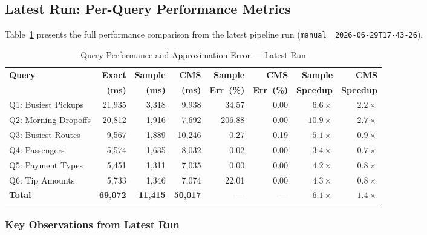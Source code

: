 \documentclass{article}
\begin{document}
\subsection{Latest Run: Per-Query Performance Metrics}

Table~\ref{tab:latest_metrics} presents the full performance comparison from the latest pipeline run (\texttt{manual\_\_2026-06-29T17-43-26}).

\begin{table}[H]
\centering
\caption{Query Performance and Approximation Error — Latest Run}
\label{tab:latest_metrics}
\begin{tabular}{l r r r r r r r}
\toprule
\textbf{Query} & \textbf{Exact} & \textbf{Sample} & \textbf{CMS} & \textbf{Sample} & \textbf{CMS} & \textbf{Sample} & \textbf{CMS} \\
               & \textbf{(ms)}  & \textbf{(ms)}   & \textbf{(ms)} & \textbf{Err~(\%)} & \textbf{Err~(\%)} & \textbf{Speedup} & \textbf{Speedup} \\
\midrule
Q1: Busiest Pickups     & 21{,}935 & 3{,}318 & 9{,}938  & 34.57  & 0.00 & $6.6\times$ & $2.2\times$ \\
Q2: Morning Dropoffs    & 20{,}812 & 1{,}916 & 7{,}692  & 206.88 & 0.00 & $10.9\times$ & $2.7\times$ \\
Q3: Busiest Routes      & 9{,}567  & 1{,}889 & 10{,}246 & 0.27   & 0.19 & $5.1\times$ & $0.9\times$ \\
Q4: Passengers          & 5{,}574  & 1{,}635 & 8{,}032  & 0.02   & 0.00 & $3.4\times$ & $0.7\times$ \\
Q5: Payment Types       & 5{,}451  & 1{,}311 & 7{,}035  & 0.00   & 0.00 & $4.2\times$ & $0.8\times$ \\
Q6: Tip Amounts         & 5{,}733  & 1{,}346 & 7{,}074  & 22.01  & 0.00 & $4.3\times$ & $0.8\times$ \\
\midrule
\textbf{Total}          & \textbf{69{,}072} & \textbf{11{,}415} & \textbf{50{,}017} & — & — & $\mathbf{6.1\times}$ & $\mathbf{1.4\times}$ \\
\bottomrule
\end{tabular}
\end{table}

\subsubsection{Key Observations from Latest Run}
\end{document}
